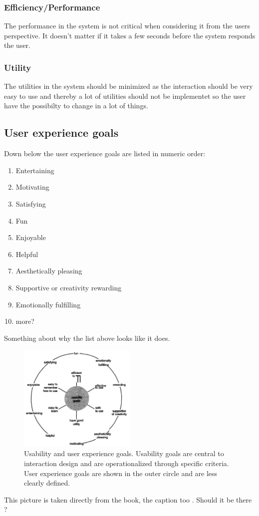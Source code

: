 \subsubsection{Efficiency/Performance}
The performance in the system is not critical when considering it from the users
perspective. It doesn't matter if it takes a few seconds before the system
responds the user.
\subsubsection{Utility}
The utilities in the system should be minimized as the interaction should be
very easy to use and thereby a lot of utilities should not be implementet so the
user have the possibilty to change in a lot of things.
\subsection{User experience goals}
Down below the user experience goals are listed in numeric order:
\begin{enumerate}
	\item Entertaining
	\item Motivating
	\item Satisfying
	\item Fun
	\item Enjoyable
	\item Helpful
	\item Aesthetically pleasing
	\item Supportive or creativity rewarding
	\item Emotionally fulfilling
	\item more?
\end{enumerate}
Something about why the list above looks like it does.

\begin{figure}[h!]		%
 \begin{centering}
  \includegraphics[width=0.5\textwidth]{images/usability_goals_diagram.png}
   \caption{Usability and user experience goals. Usability goals are central to
  			interaction design and are operationalized through specific criteria. 
  			User experience goals are shown in the outer circle and are less clearly defined.}
 \end{centering}
\end{figure}

This picture is taken directly from the book, the caption too . Should it be
there ?

